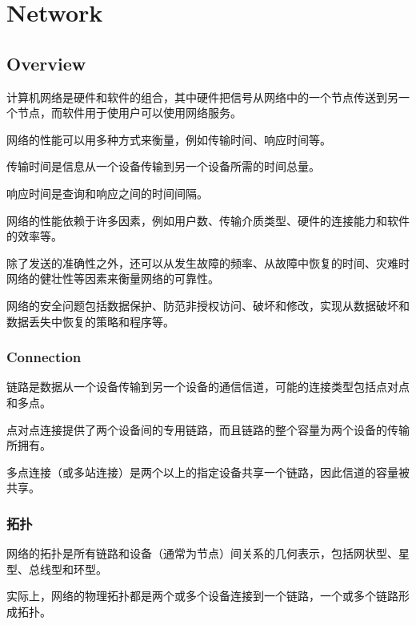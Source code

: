 \part{Network}

\chapter{Overview}


计算机网络是硬件和软件的组合，其中硬件把信号从网络中的一个节点传送到另一个节点，而软件用于使用户可以使用网络服务。

网络的性能可以用多种方式来衡量，例如传输时间、响应时间等。

\begin{compactitem}
\item 传输时间是信息从一个设备传输到另一个设备所需的时间总量。
\item 响应时间是查询和响应之间的时间间隔。
\end{compactitem}

网络的性能依赖于许多因素，例如用户数、传输介质类型、硬件的连接能力和软件的效率等。

除了发送的准确性之外，还可以从发生故障的频率、从故障中恢复的时间、灾难时网络的健壮性等因素来衡量网络的可靠性。

网络的安全问题包括数据保护、防范非授权访问、破坏和修改，实现从数据破坏和数据丢失中恢复的策略和程序等。

\section{Connection}

链路是数据从一个设备传输到另一个设备的通信信道，可能的连接类型包括点对点和多点。

\begin{compactitem}
\item 点对点连接提供了两个设备间的专用链路，而且链路的整个容量为两个设备的传输所拥有。
\item 多点连接（或多站连接）是两个以上的指定设备共享一个链路，因此信道的容量被共享。
\end{compactitem}

\section{拓扑}

网络的拓扑是所有链路和设备（通常为节点）间关系的几何表示，包括网状型、星型、总线型和环型。

实际上，网络的物理拓扑都是两个或多个设备连接到一个链路，一个或多个链路形成拓扑。

